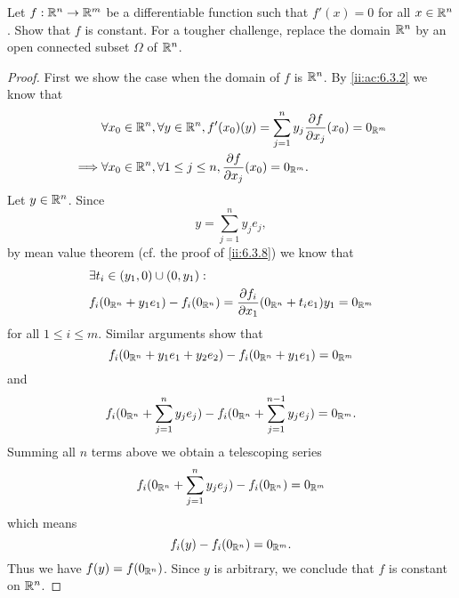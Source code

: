 \begin{ex}\label{ii:ex:6.3.4}
  Let \(f : \mathbb{R}^n \to \mathbb{R}^m\) be a differentiable function such that \(f'(x) = 0\) for all \(x \in \mathbb{R}^n\).
  Show that \(f\) is constant.
  For a tougher challenge, replace the domain \(\mathbb{R}^n\) by an open connected subset \(\Omega\) of \(\mathbb{R}^n\).
\end{ex}

\begin{proof}
  First we show the case when the domain of \(f\) is \(\mathbb{R}^n\).
  By \cref{ii:ac:6.3.2} we know that
  \begin{align*}
             & \forall x_0 \in \mathbb{R}^n, \forall y \in \mathbb{R}^n, f'(x_0)(y) = \sum_{j = 1}^n y_j \dfrac{\partial f}{\partial x_j}(x_0) = 0_{\mathbb{R}^m} \\
    \implies & \forall x_0 \in \mathbb{R}^n, \forall 1 \leq j \leq n, \dfrac{\partial f}{\partial x_j}(x_0) = 0_{\mathbb{R}^m}.
  \end{align*}
  Let \(y \in \mathbb{R}^n\).
  Since
  \[
    y = \sum_{j = 1}^n y_j e_j,
  \]
  by mean value theorem (cf. the proof of \cref{ii:6.3.8}) we know that
  \begin{align*}
     & \exists t_i \in (y_1, 0) \cup (0, y_1) :                                                                        \\
     & f_i(0_{\mathbb{R}^n} + y_1 e_1) - f_i(0_{\mathbb{R}^n}) = \dfrac{\partial f_i}{\partial x_1}(0_{\mathbb{R}^n} + t_i e_1) y_1 = 0_{\mathbb{R}^m}
  \end{align*}
  for all \(1 \leq i \leq m\).
  Similar arguments show that
  \[
    f_i(0_{\mathbb{R}^n} + y_1 e_1 + y_2 e_2) - f_i(0_{\mathbb{R}^n} + y_1 e_1) = 0_{\mathbb{R}^m}
  \]
  and
  \[
    f_i(0_{\mathbb{R}^n} + \sum_{j = 1}^n y_j e_j) - f_i(0_{\mathbb{R}^n} + \sum_{j = 1}^{n - 1} y_j e_j) = 0_{\mathbb{R}^m}.
  \]
  Summing all \(n\) terms above we obtain a telescoping series
  \[
    f_i(0_{\mathbb{R}^n} + \sum_{j = 1}^n y_j e_j) - f_i(0_{\mathbb{R}^n}) = 0_{\mathbb{R}^m}
  \]
  which means
  \[
    f_i(y) - f_i(0_{\mathbb{R}^n}) = 0_{\mathbb{R}^m}.
  \]
  Thus we have \(f(y) = f(0_{\mathbb{R}^n})\).
  Since \(y\) is arbitrary, we conclude that \(f\) is constant on \(\mathbb{R}^n\).


\end{proof}
